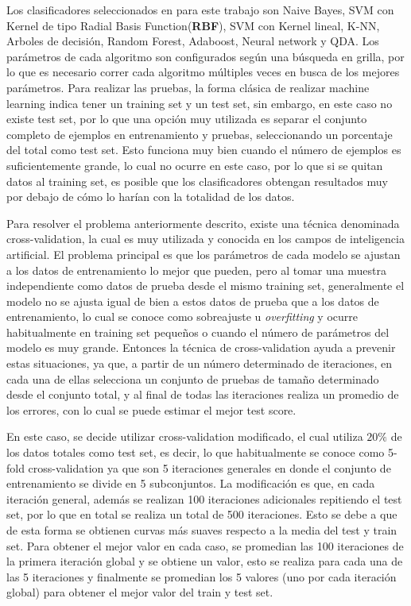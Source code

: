 Los clasificadores seleccionados en para este trabajo son Naive Bayes, SVM con Kernel de tipo Radial Basis Function(\textbf{RBF}), SVM con Kernel lineal, K-NN, Arboles de decisión, Random Forest, Adaboost, Neural network y QDA. Los parámetros de cada algoritmo son configurados según una búsqueda en grilla, por lo que es necesario correr cada algoritmo múltiples veces en busca de los mejores parámetros. Para realizar las pruebas, la forma clásica de realizar machine learning indica tener un training set y un test set, sin embargo, en este caso no existe test set, por lo que una opción muy utilizada es separar el conjunto completo de ejemplos en entrenamiento y pruebas, seleccionando un porcentaje del total como test set. Esto funciona muy bien cuando el número de ejemplos es suficientemente grande, lo cual no ocurre en este caso, por lo que si se quitan datos al training set, es posible que los clasificadores obtengan resultados muy por debajo de cómo lo harían con la totalidad de los datos.

Para resolver el problema anteriormente descrito, existe una técnica denominada cross-validation, la cual es muy utilizada y conocida en los campos de inteligencia artificial. El problema principal es que los parámetros de cada modelo se ajustan a los datos de entrenamiento lo mejor que pueden, pero al tomar una muestra independiente como datos de prueba desde el mismo training set, generalmente el modelo no se ajusta igual de bien a estos datos de prueba que a los datos de entrenamiento, lo cual se conoce como sobreajuste u \textit{overfitting} y ocurre habitualmente en training set pequeños o cuando el número de parámetros del modelo es muy grande. Entonces la técnica de cross-validation ayuda a prevenir estas situaciones, ya que, a partir de un número determinado de iteraciones, en cada una de ellas selecciona un conjunto de pruebas de tamaño determinado desde el conjunto total, y al final de todas las iteraciones realiza un promedio de los errores, con lo cual se puede estimar el mejor test score.

En este caso, se decide utilizar cross-validation modificado, el cual utiliza $20\%$ de los datos totales como test set, es decir, lo que habitualmente se conoce como 5-fold cross-validation ya que son 5 iteraciones generales en donde el conjunto de entrenamiento se divide en 5 subconjuntos. La modificación es que, en cada iteración general, además se realizan 100 iteraciones adicionales repitiendo el test set, por lo que en total se realiza un total de 500 iteraciones. Esto se debe a que de esta forma se obtienen curvas más suaves respecto a la media del test y train set. Para obtener el mejor valor en cada caso, se promedian las 100 iteraciones de la primera iteración global y se obtiene un valor, esto se realiza para cada una de las 5 iteraciones y finalmente se promedian los 5 valores (uno por cada iteración global) para obtener el mejor valor del train y test set.

